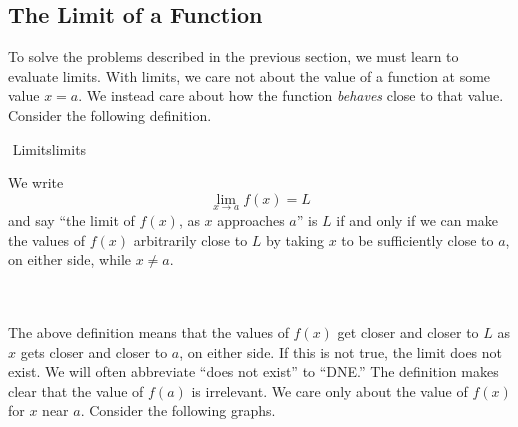     \pagebreak

    \subsection{The Limit of a Function}

        To solve the problems described in the previous section, we must learn to evaluate limits. With limits, we care not about the value of a function at some value \(x=a\). We instead care about how the function \textit{behaves} close to that value. Consider the following definition.
        \begin{definition}{\Stop\,\,Limits}{limits}

            We write
            \begin{equation*}
                \lim_{x\to a}f(x)=L
            \end{equation*}
            and say ``the limit of \(f(x)\), as \(x\) approaches \(a\)'' is \(L\) if and only if we can make the values of \(f(x)\) arbitrarily close to \(L\) by taking \(x\) to be sufficiently close to \(a\), on either side, while \(x\neq a\).
            
        \end{definition}
        \vphantom
        \\
        \\
        The above definition means that the values of \(f(x)\) get closer and closer to \(L\) as \(x\) gets closer and closer to \(a\), on either side. If this is not true, the limit does not exist. We will often abbreviate ``does not exist'' to ``DNE.'' The definition makes clear that the value of \(f(a)\) is irrelevant. We care only about the value of \(f(x)\) for \(x\) near \(a\). Consider the following graphs.
